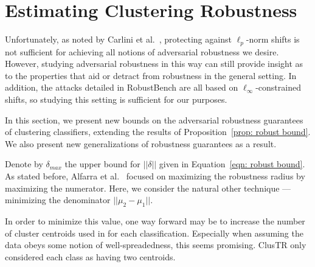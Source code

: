 \section{Estimating Clustering Robustness}

Unfortunately, as noted by Carlini et al.~\cite{Carlini2019Robustness}, protecting against $\ell_p$-norm shifts is not sufficient for achieving all notions of adversarial robustness we desire. However, studying adversarial robustness in this way can still provide insight as to the properties that aid or detract from robustness in the general setting. In addition, the attacks detailed in RobustBench are all based on $\ell_\infty$-constrained shifts, so studying this setting is sufficient for our purposes. 

In this section, we present new bounds on the adversarial robustness guarantees of clustering classifiers, extending the results of Proposition~\ref{prop: robust bound}. We also present new generalizations of robustness guarantees as a result. 

Denote by $\delta_{max}$ the upper bound for $||\delta||$ given in Equation~\ref{eqn: robust bound}. As stated before, Alfarra et al.~\cite{Alfarra2020ClusTR} focused on maximizing the robustness radius by maximizing the numerator. Here, we consider the natural other technique — minimizing the denominator $||\mu_2-\mu_1||$. 

In order to minimize this value, one way forward may be to increase the number of cluster centroids used in for each classification. Especially when assuming the data obeys some notion of well-spreadedness, this seems promising. ClusTR only considered each class as having two centroids. 

